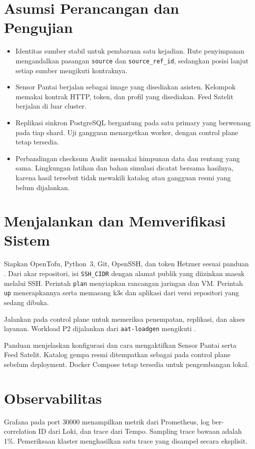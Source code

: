 \section{Asumsi Perancangan dan Pengujian}
\begin{itemize}
\item Identitas sumber stabil untuk pembaruan satu kejadian. Rute penyimpanan mengandalkan pasangan \texttt{source} dan \texttt{source\_ref\_id}, sedangkan posisi lanjut setiap sumber mengikuti kontraknya.
\item Sensor Pantai berjalan sebagai image yang disediakan asisten. Kelompok memakai kontrak HTTP, token, dan profil yang disediakan. Feed Satelit berjalan di luar cluster.
\item Replikasi sinkron PostgreSQL bergantung pada satu primary yang berwenang pada tiap shard. Uji gangguan menargetkan worker, dengan control plane tetap tersedia.
\item Perbandingan checksum Audit memakai himpunan data dan rentang yang sama. Lingkungan latihan dan bahan simulasi dicatat bersama hasilnya, karena hasil tersebut tidak mewakili katalog atau gangguan resmi yang belum dijalankan.
\end{itemize}

\section{Menjalankan dan Memverifikasi Sistem}
Siapkan OpenTofu, Python~3, Git, OpenSSH, dan token Hetzner sesuai panduan . Dari akar repositori, isi \texttt{SSH\_CIDR} dengan alamat publik yang diizinkan masuk melalui SSH. Perintah \texttt{plan} menyiapkan rancangan jaringan dan VM. Perintah \texttt{up} menerapkannya serta memasang k3s dan aplikasi dari versi repositori yang sedang dibuka.


Jalankan  pada control plane untuk memeriksa penempatan, replikasi, dan akses layanan. Workload P2 dijalankan dari \texttt{aat-loadgen} mengikuti .

Panduan  menjelaskan konfigurasi dan cara mengaktifkan Sensor Pantai serta Feed Satelit. Katalog gempa resmi ditempatkan sebagai  pada control plane sebelum deployment. Docker Compose tetap tersedia untuk pengembangan lokal.

\section{Observabilitas}
Grafana pada port 30000 menampilkan metrik dari Prometheus, log ber-correlation ID dari Loki, dan trace dari Tempo. Sampling trace bawaan adalah 1\%. Pemeriksaan klaster menghasilkan satu trace yang disampel secara eksplisit.
